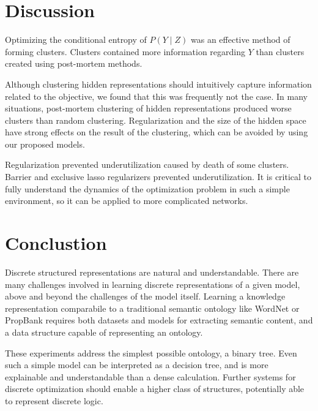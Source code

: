 \documentclass[11pt,letterpaper]{article}
\begin{document}
\section{Discussion}

Optimizing the conditional entropy of $P(Y\mid Z)$ was an effective method of forming clusters. Clusters contained more information regarding $Y$ than clusters created using post-mortem methods.

Although clustering hidden representations should intuitively capture information related to the objective, we found that this was frequently not the case. In many situations, post-mortem clustering of hidden representations produced worse clusters than random clustering. Regularization and the size of the hidden space have strong effects on the result of the clustering, which can be avoided by using our proposed models.

Regularization prevented underutilization caused by death of some clusters. Barrier and exclusive lasso regularizers prevented underutilization. It is critical to fully understand the dynamics of the optimization problem in such a simple environment, so it can be applied to more complicated networks.

\section{Conclustion}
Discrete structured representations are natural and understandable. There are many challenges involved in learning discrete representations of a given model, above and beyond the challenges of the model itself. Learning a knowledge representation comparabile to a traditional semantic ontology like WordNet or PropBank requires both datasets and models for extracting semantic content, and a data structure capable of representing an ontology. 

These experiments address the simplest possible ontology, a binary tree. Even such a simple model can be interpreted as a decision tree, and is more explainable and understandable than a dense calculation. Further systems for discrete optimization should enable a higher class of structures, potentially able to represent discrete logic.



\end{document}
